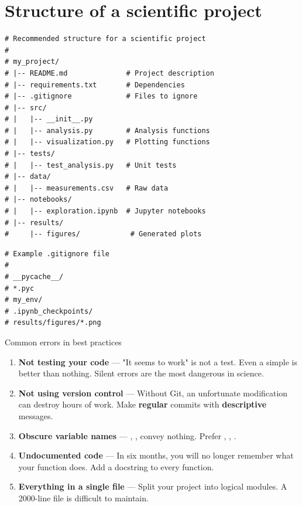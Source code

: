 \section{Structure of a scientific project}

\begin{codeblock}[title=\textbf{Python}]
\begin{verbatim}
# Recommended structure for a scientific project
#
# my_project/
# |-- README.md              # Project description
# |-- requirements.txt       # Dependencies
# |-- .gitignore             # Files to ignore
# |-- src/
# |   |-- __init__.py
# |   |-- analysis.py        # Analysis functions
# |   |-- visualization.py   # Plotting functions
# |-- tests/
# |   |-- test_analysis.py   # Unit tests
# |-- data/
# |   |-- measurements.csv   # Raw data
# |-- notebooks/
# |   |-- exploration.ipynb  # Jupyter notebooks
# |-- results/
#     |-- figures/            # Generated plots
\end{verbatim}
\end{codeblock}

\begin{codeblock}[title=\textbf{Python}]
\begin{verbatim}
# Example .gitignore file
#
# __pycache__/
# *.pyc
# my_env/
# .ipynb_checkpoints/
# results/figures/*.png
\end{verbatim}
\end{codeblock}

\begin{errmark}{Common errors in best practices}
\begin{enumerate}
  \item \textbf{Not testing your code} --- "It seems to work" is not a
    test. Even a simple  is better than nothing. Silent errors
    are the most dangerous in science.
  \item \textbf{Not using version control} --- Without Git, an unfortunate modification can
    destroy hours of work. Make \textbf{regular} commits with
    \textbf{descriptive} messages.
  \item \textbf{Obscure variable names} --- , ,  convey
    nothing. Prefer , ,
    .
  \item \textbf{Undocumented code} --- In six months, you will no longer remember
    what your function does. Add a docstring to every function.
  \item \textbf{Everything in a single file} --- Split your project into logical
    modules. A 2000-line file is difficult to maintain.
\end{enumerate}
\end{errmark}

